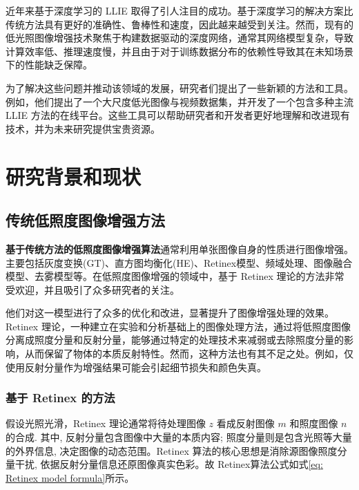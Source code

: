 \documentclass[a4paper, 10pt]{article}
\begin{document}
	近年来基于深度学习的 LLIE 取得了引人注目的成功。基于深度学习的解决方案比传统方法具有更好的准确性、鲁棒性和速度，因此越来越受到关注。然而，现有的低光照图像增强技术聚焦于构建数据驱动的深度网络，通常其网络模型复杂，导致计算效率低、推理速度慢，并且由于对于训练数据分布的依赖性导致其在未知场景下的性能缺乏保障。
	
	为了解决这些问题并推动该领域的发展，研究者们提出了一些新颖的方法和工具。例如，他们提出了一个大尺度低光图像与视频数据集，并开发了一个包含多种主流 LLIE 方法的在线平台。这些工具可以帮助研究者和开发者更好地理解和改进现有技术，并为未来研究提供宝贵资源。
	
	\section{研究背景和现状}
	
	\subsection{传统低照度图像增强方法}
	\textbf{基于传统方法的低照度图像增强算法}通常利用单张图像自身的性质进行图像增强。主要包括灰度变换(GT)\textcolor{blue}{\cite{ueng1995gamma}}、直方图均衡化(HE)\textcolor{blue}{\cite{stark2000adaptive}}、Retinex模型\textcolor{blue}{\cite{land1971lightness}}、频域处理\textcolor{blue}{\cite{liu2021benchmarking}}、图像融合模型\textcolor{blue}{\cite{dai2019fractional}}、去雾模型\textcolor{blue}{\cite{ma2019improved}}等。在低照度图像增强的领域中，基于 Retinex 理论的方法非常受欢迎，并且吸引了众多研究者的关注。
	
	他们对这一模型进行了众多的优化和改进，显著提升了图像增强处理的效果。Retinex 理论，一种建立在实验和分析基础上的图像处理方法，通过将低照度图像分离成照度分量和反射分量，能够通过特定的处理技术来减弱或去除照度分量的影响，从而保留了物体的本质反射特性。然而，这种方法也有其不足之处。例如，仅使用反射分量作为增强结果可能会引起细节损失和颜色失真。
	
	\subsubsection{基于 Retinex 的方法}
	
	假设光照光滑，Retinex 理论通常将待处理图像 $z$ 看成反射图像 $m$ 和照度图像 $n$ 的合成. 其中, 反射分量包含图像中大量的本质内容; 照度分量则是包含光照等大量的外界信息, 决定图像的动态范围。Retinex 算法的核心思想是消除源图像照度分量干扰, 依据反射分量信息还原图像真实色彩。故 Retinex算法公式如式\ref{eq: Retinex model formula}所示。
	
\end{document}
